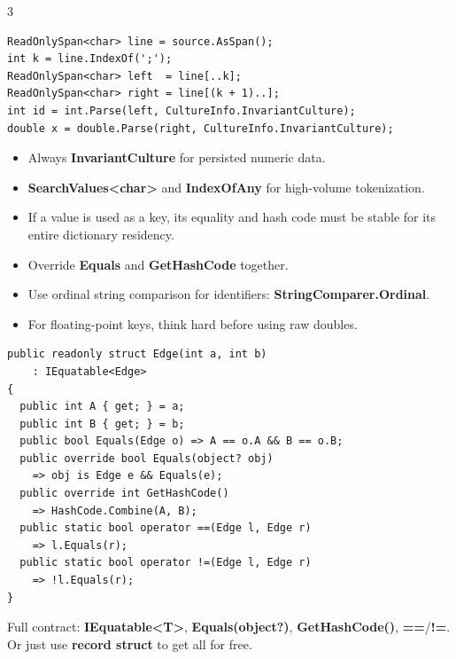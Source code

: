 \documentclass[9pt,a4paper]{extarticle}
\newenvironment{card}[3][acBlue]{%
  \begin{tcolorbox}[
    enhanced, colback=#2, colframe=bdCard,
    coltitle=black, colbacktitle=#2!70!bgHdr,
    fonttitle=\bfseries\fontsize{6.0pt}{7.2pt}\selectfont\MakeUppercase,
    title={#3},
    left=3pt, right=2pt, top=1.2pt, bottom=1.6pt,
    toptitle=1.0pt, bottomtitle=1.0pt,
    boxrule=0.4pt,
    borderline west={3pt}{0pt}{#1},
    arc=2pt, before skip=0pt, after skip=1.6mm,
    breakable,
  ]}{\end{tcolorbox}}
\newcommand{\code}[1]{{\ttfamily\bfseries #1}}
\begin{document}
\begin{multicols}{3}
\begin{card}[acNavy]{bgNavy}{Span-Based Parsing}
\begin{lstlisting}[style=cs]
ReadOnlySpan<char> line = source.AsSpan();
int k = line.IndexOf(';');
ReadOnlySpan<char> left  = line[..k];
ReadOnlySpan<char> right = line[(k + 1)..];
int id = int.Parse(left, CultureInfo.InvariantCulture);
double x = double.Parse(right, CultureInfo.InvariantCulture);
\end{lstlisting}
\begin{itemize}
\item Always \code{InvariantCulture} for persisted numeric data.
\item \code{SearchValues<char>} and \code{IndexOfAny} for high-volume tokenization.
\end{itemize}
\end{card}

\begin{card}[acGreen]{bgGreen}{Equality, Hashing, and Stable Keys}
\begin{itemize}
\item If a value is used as a key, its equality and hash code must be stable for its entire dictionary residency.
\item Override \code{Equals} and \code{GetHashCode} together.
\item Use ordinal string comparison for identifiers: \code{StringComparer.Ordinal}.
\item For floating-point keys, think hard before using raw doubles.
\end{itemize}
\begin{lstlisting}[style=cs]
public readonly struct Edge(int a, int b)
    : IEquatable<Edge>
{
  public int A { get; } = a;
  public int B { get; } = b;
  public bool Equals(Edge o) => A == o.A && B == o.B;
  public override bool Equals(object? obj)
    => obj is Edge e && Equals(e);
  public override int GetHashCode()
    => HashCode.Combine(A, B);
  public static bool operator ==(Edge l, Edge r)
    => l.Equals(r);
  public static bool operator !=(Edge l, Edge r)
    => !l.Equals(r);
}
\end{lstlisting}
Full contract: \code{IEquatable<T>}, \code{Equals(object?)}, \code{GetHashCode()}, \code{==}/\code{!=}. Or just use \code{record struct} to get all for free.
\end{card}


\end{multicols}
\end{document}
